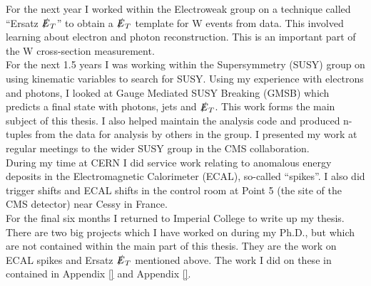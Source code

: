 For the next year I worked within the Electroweak group on a technique called 
``Ersatz $\slashed{E}_{T}$'' to obtain a $\slashed{E}_{T}$ template for W events from data. This 
involved learning about electron and photon reconstruction. This is an important 
part of the W cross-section measurement. \\

For the next 1.5 years I was working within the Supersymmetry (SUSY) group on 
using kinematic variables to search for SUSY. Using my experience with electrons 
and photons, I looked at Gauge Mediated SUSY Breaking (GMSB) which predicts a 
final state with photons, jets and $\slashed{E}_{T}$. This work forms the main subject of 
this thesis. I also helped maintain the analysis code and produced n-tuples from 
the data for analysis by others in the group. I presented my work at regular 
meetings to the wider SUSY group in the CMS collaboration. \\

During my time at CERN I did service work relating to anomalous energy deposits 
in the Electromagnetic Calorimeter (ECAL), so-called ``spikes''. I also did 
trigger shifts and ECAL shifts in the control room at Point 5 (the site of the 
CMS detector) near Cessy in France. \\

For the final six months I returned to Imperial College to write up my thesis.
\\

There are two big projects which I have worked on during my Ph.D., but which are
not contained within the main part of this thesis. They are the work on ECAL 
spikes and Ersatz $\slashed{E}_{T}$ mentioned above. The work I did on these in contained
in Appendix \ref{} and Appendix \ref{}.
